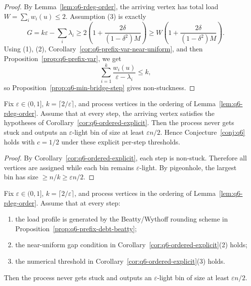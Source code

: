 \begin{proof}
By Lemma~\ref{lem:q6-rdeg-order}, the arriving vertex has total load
\(W=\sum_i w_i(u)\le 2\).
Assumption (3) is exactly
\[
G=k\varepsilon-\sum_i\lambda_i
\ge
2\left(1+\frac{2\delta}{(1-\delta^2)M}\right)
\ge
W\left(1+\frac{2\delta}{(1-\delta^2)M}\right).
\]
Using (1), (2), Corollary~\ref{cor:q6-prefix-var-near-uniform},
and then Proposition~\ref{prop:q6-prefix-var}, we get
\[
\sum_{i=1}^k\frac{w_i(u)}{\varepsilon-\lambda_i}\le k,
\]
so Proposition~\ref{prop:q6-min-bridge-step} gives non-stuckness.
\end{proof}

\begin{theorem}[Ordered explicit route to \(c=1/2\)]\label{thm:q6-ordered-explicit-route}
Fix \(\varepsilon\in(0,1]\), \(k=\lceil 2/\varepsilon\rceil\), and process
vertices in the ordering of Lemma~\ref{lem:q6-rdeg-order}.
Assume that at every step, the arriving vertex satisfies the hypotheses of
Corollary~\ref{cor:q6-ordered-explicit}.
Then the process never gets stuck and outputs an \(\varepsilon\)-light bin
of size at least \(\varepsilon n/2\).
Hence Conjecture~\ref{conj:q6} holds with \(c=1/2\) under these explicit
per-step thresholds.
\end{theorem}

\begin{proof}
By Corollary~\ref{cor:q6-ordered-explicit}, each step is non-stuck.
Therefore all vertices are assigned while each bin remains
\(\varepsilon\)-light. By pigeonhole, the largest bin has size
\(\ge n/k\ge \varepsilon n/2\).
\end{proof}

\begin{corollary}
\label{cor:q6-ordered-explicit-beatty-route}
Fix \(\varepsilon\in(0,1]\), \(k=\lceil 2/\varepsilon\rceil\), and process
vertices in the ordering of Lemma~\ref{lem:q6-rdeg-order}.
Assume that at every step:
\begin{enumerate}[nosep]
\item the load profile is generated by the Beatty/Wythoff rounding
scheme in Proposition~\ref{prop:q6-prefix-debt-beatty};
\item the near-uniform gap condition in
Corollary~\ref{cor:q6-ordered-explicit}(2) holds;
\item the numerical threshold in
Corollary~\ref{cor:q6-ordered-explicit}(3) holds.
\end{enumerate}
Then the process never gets stuck and outputs an \(\varepsilon\)-light bin
of size at least \(\varepsilon n/2\).
\end{corollary}

